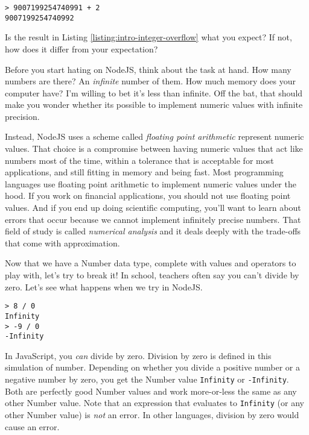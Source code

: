 \begin{lstlisting}[caption={\label{listing:intro-integer-overflow} The limitations of finite memory.}]
> 9007199254740991 + 2
9007199254740992
\end{lstlisting}

\begin{question}
  Is the result in Listing \ref{listing:intro-integer-overflow} what you expect? If not, how does it differ from your expectation?
\end{question}

Before you start hating on NodeJS, think about the task at hand. How many numbers are there? An \emph{infinite} number of them. How much memory does your computer have? I'm willing to bet it's less than infinite. Off the bat, that should make you wonder whether its possible to implement numeric values with infinite precision.

Instead, NodeJS uses a scheme called \textit{floating point arithmetic} represent numeric values.  That choice is a compromise between having numeric values that act like numbers most of the time, within a tolerance that is acceptable for most applications, and still fitting in memory and being fast. Most programming languages use floating point arithmetic to implement numeric values under the hood. If you work on financial applications, you should not use floating point values. And if you end up doing scientific computing, you'll want to learn about errors that occur because we cannot implement infinitely precise numbers. That field of study is called \emph{numerical analysis} and it deals deeply with the trade-offs that come with approximation.

Now that we have a \textsf{Number} data type, complete with values and operators to play with, let's try to break it! In school, teachers often say you can't divide by zero. Let's see what happens when we try in NodeJS.

\begin{lstlisting}
> 8 / 0
Infinity
> -9 / 0
-Infinity
\end{lstlisting}

In JavaScript, you \emph{can} divide by zero. Division by zero is defined in this simulation of number. Depending on whether you divide a positive number or a negative number by zero, you get the \textsf{Number} value \texttt{Infinity} or \texttt{-Infinity}. Both are perfectly good \textsf{Number} values and work more-or-less the same as any other \textsf{Number} value. Note that an expression that evaluates to \texttt{Infinity} (or any other \textsf{Number} value) is \emph{not} an error. In other languages, division by zero would cause an error.

